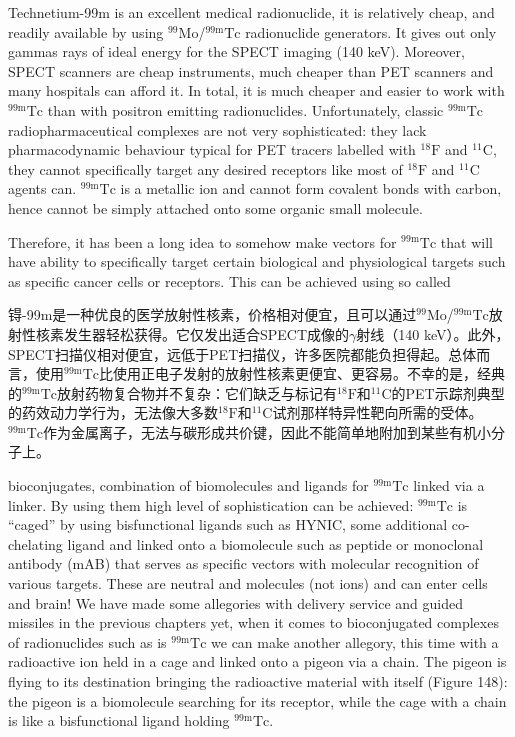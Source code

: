 \documentclass[dvipsnames, svgnames,a4paper,11pt]{article}
\begin{document}
Technetium-99m is an excellent medical radionuclide, it is relatively cheap, and
readily available by using ${}^\mathrm{99}\mathrm{Mo}$/${}^\mathrm{99m}\mathrm{Tc}$ radionuclide generators. It gives out only
gammas rays of ideal energy for the SPECT imaging (140 keV). Moreover, SPECT
scanners are cheap instruments, much cheaper than PET scanners and many
hospitals can afford it. In total, it is much cheaper and easier to work with ${}^\mathrm{99m}\mathrm{Tc}$ than
with positron emitting radionuclides. Unfortunately, classic ${}^\mathrm{99m}\mathrm{Tc}$ radiopharmaceutical
complexes are not very sophisticated: they lack pharmacodynamic behaviour typical
for PET tracers labelled with ${}^\mathrm{18}\mathrm{F}$ and ${}^\mathrm{11}\mathrm{C}$, they cannot specifically target any desired
receptors like most of ${}^\mathrm{18}\mathrm{F}$ and ${}^\mathrm{11}\mathrm{C}$ agents can. ${}^\mathrm{99m}\mathrm{Tc}$ is a metallic ion and cannot form
covalent bonds with carbon, hence cannot be simply attached onto some organic
small molecule.

Therefore, it has been a long idea to somehow make vectors for ${}^\mathrm{99m}\mathrm{Tc}$ that will have
ability to specifically target certain biological and physiological targets such as
specific cancer cells or receptors. This can be achieved using so called
 
锝-99m是一种优良的医学放射性核素，价格相对便宜，且可以通过${}^\mathrm{99}\mathrm{Mo}$/${}^\mathrm{99m}\mathrm{Tc}$放射性核素发生器轻松获得。它仅发出适合SPECT成像的$\gamma$射线（140 keV）。此外，SPECT扫描仪相对便宜，远低于PET扫描仪，许多医院都能负担得起。总体而言，使用${}^\mathrm{99m}\mathrm{Tc}$比使用正电子发射的放射性核素更便宜、更容易。不幸的是，经典的${}^\mathrm{99m}\mathrm{Tc}$放射药物复合物并不复杂：它们缺乏与标记有${}^\mathrm{18}\mathrm{F}$和${}^\mathrm{11}\mathrm{C}$的PET示踪剂典型的药效动力学行为，无法像大多数${}^\mathrm{18}\mathrm{F}$和${}^\mathrm{11}\mathrm{C}$试剂那样特异性靶向所需的受体。${}^\mathrm{99m}\mathrm{Tc}$作为金属离子，无法与碳形成共价键，因此不能简单地附加到某些有机小分子上。

bioconjugates, combination of biomolecules and ligands for ${}^\mathrm{99m}\mathrm{Tc}$ linked via a linker.
By using them high level of sophistication can be achieved: ${}^\mathrm{99m}\mathrm{Tc}$ is “caged” by using
bisfunctional ligands such as HYNIC, some additional co-chelating ligand and linked
onto a biomolecule such as peptide or monoclonal antibody (mAB) that serves as
specific vectors with molecular recognition of various targets. These are neutral and
molecules (not ions) and can enter cells and brain! We have made some allegories
with delivery service and guided missiles in the previous chapters yet, when it comes
to bioconjugated complexes of radionuclides such as is ${}^\mathrm{99m}\mathrm{Tc}$ we can make another
allegory, this time with a radioactive ion held in a cage and linked onto a pigeon via a
chain. The pigeon is flying to its destination bringing the radioactive material with
itself (Figure 148): the pigeon is a biomolecule searching for its receptor, while the
cage with a chain is like a bisfunctional ligand holding ${}^\mathrm{99m}\mathrm{Tc}$.
\end{document}
